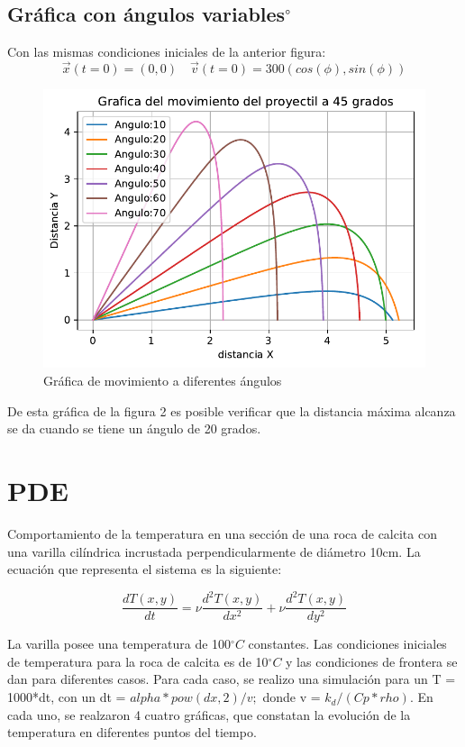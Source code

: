 \documentclass{IEEEtran}
\begin{document}
\subsection{Gráfica con ángulos variables$^\circ$}
Con las mismas condiciones iniciales de la anterior figura:
\begin{equation}
    \vec{x}(t=0)=(0,0) \quad \vec{v}(t=0)=300(cos(\phi),sin(\phi))
\end{equation}
\begin{figure}[h]
    \centering
    \includegraphics[scale = 0.6]{ODE_varicion_grados.pdf}
    \caption{Gráfica de movimiento a diferentes ángulos}
    \label{fig:my_label}
\end{figure}
De esta gráfica de la figura 2 es posible verificar que la distancia máxima alcanza se da cuando se tiene un ángulo de 20 grados.

\section*{PDE}
Comportamiento de la temperatura en una sección de una roca de calcita con una varilla cilíndrica incrustada perpendicularmente de diámetro 10cm. La ecuación que representa el sistema es la siguiente:

\begin{equation}
    \frac{dT(x,y)}{dt}=\nu\frac{d^{2}T(x,y)}{dx^{2}}+\nu\frac{d^{2}T(x,y)}{dy^{2}}
\end{equation}

La varilla posee una temperatura de 100$^{\circ}C$ constantes. Las condiciones iniciales de temperatura para la roca de calcita es de 10$^{\circ}C$ y las condiciones de frontera se dan para diferentes casos. Para cada caso, se realizo una simulación para un T = 1000*dt, con un dt = $ alpha*pow(dx,2)/v;$ donde v = $k_d/(Cp*rho)$. En cada uno, se realzaron 4 cuatro gráficas, que constatan la evolución de la temperatura en diferentes puntos del tiempo.
\end{document}
